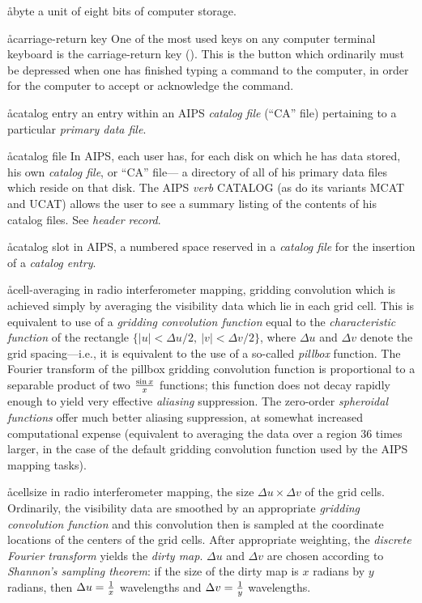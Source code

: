 \aa{byte}
a unit of eight bits of computer storage.

\aa{carriage-return key}
One of the most used keys on any computer terminal keyboard is the
carriage-return key (\CRn).
This is the button which ordinarily must be depressed when one has
finished typing a command to the computer, in order for the
computer to accept or acknowledge the command.

\aa{catalog entry}
an entry within an AIPS {\it catalog file} (``CA'' file) pertaining
to a particular {\it primary data file}.

\aa{catalog file}
In AIPS, each user has, for each disk on which he has data stored,
his own {\it catalog file}, or ``CA'' file---%
a directory of all of his primary data files which reside on that disk.
The AIPS {\it verb} CATALOG (as do its variants MCAT and UCAT)
allows the user to see a summary listing of the contents of his
catalog files.
See {\it header record}.

\aa{catalog slot}
in AIPS, a numbered space reserved in a {\it catalog file} for the
insertion of a {\it catalog entry}.

\aa{cell-averaging}
in radio interferometer mapping, gridding convolution which is achieved
simply by averaging the visibility data which lie in each \uv grid cell.
This is equivalent to use of a {\it gridding convolution function}
equal to the {\it characteristic function} of the rectangle
$\{|u|<\Delta u/2,\ |v|<\Delta v/2\}$, where $\Delta u$ and $\Delta v$
denote the grid spacing---i.e., it is equivalent to the use of a
so-called {\it pillbox} function.
The Fourier transform of the pillbox gridding convolution function
is proportional to a separable product of two $\sin x\over x$ functions;
this function does not decay rapidly enough to yield very effective
{\it aliasing} suppression.
The zero-order {\it spheroidal functions} offer much better aliasing
suppression, at somewhat increased computational expense (equivalent
to averaging the data over a region 36 times larger, in the case of
the default gridding convolution function used by the AIPS mapping
tasks).

\aa{cellsize}
in radio interferometer mapping, the size $\Delta u \times \Delta v$
of the \uv grid cells.
Ordinarily, the visibility data are smoothed by an appropriate
{\it gridding convolution function} and this convolution then is sampled
at the coordinate locations of the centers of the grid cells.
After appropriate weighting, the {\it discrete Fourier transform}
yields the {\it dirty map}.
$\Delta u$ and $\Delta v$ are chosen according to {\it Shannon's
sampling theorem}\/:  if the size of the dirty
map is $x$ radians by $y$ radians, then $\Delta u={1\over x}$
wavelengths and $\Delta v={1\over y}$ wavelengths.

